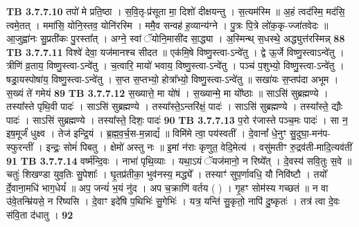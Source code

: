 \documentclass[17pt]{extarticle}
\begin{document}
{{{{{{{{{{{{{{{{{{{                  \newline
                                \textbf{ TB 3.7.7.10} \newline
                  तपो॑ मे प्रति॒ष्ठा । स॒वि॒तृ-प्र॑सूता मा॒ दिशो॑ दीक्षयन्तु । स॒त्यम॑स्मि ॥ अ॒हं त्वद॑स्मि॒ मद॑सि॒ त्वमे॒तत् । ममा॑सि॒ योनि॒स्तव॒ योनि॑रस्मि । ममै॒व सन्वह॑ ह॒व्यान्य॑ग्ने । पु॒त्रः पि॒त्रे लो॑क॒कृ-ज्जा॑तवेदः ॥ आ॒जुह्वा॑नः सु॒प्रती॑कः पु॒रस्ता᳚त् । अग्ने॒ स्वां ॅयोनि॒मासी॑द सा॒द्ध्या । अ॒स्मिन्थ् स॒धस्थे॒ अद्ध्युत्त॑रस्मिन्न् \textbf{ 88} \newline
                  \newline
                                \textbf{ TB 3.7.7.11} \newline
                  विश्वे॑ देवा॒ यज॑मानश्च सीदत ॥ एक॑मि॒षे विष्णु॒स्त्वा-ऽन्वे॑तु । द्वे ऊ॒र्जे विष्णु॒स्त्वाऽन्वे॑तु । त्रीणि॑ व्र॒ताय॒ विष्णु॒स्त्वा-ऽन्वे॑तु । च॒त्वारि॒ मायो॑ भवाय॒ विष्णु॒स्त्वा-ऽन्वे॑तु । पञ्च॑ प॒शुभ्यो॒ विष्णु॒स्त्वा-ऽन्वे॑तु । षड्रा॒यस्पोषा॑य॒ विष्णु॒स्त्वा-ऽन्वे॑तु । स॒प्त स॒प्तभ्यो॒ होत्रा᳚भ्यो॒ विष्णु॒स्त्वा-ऽन्वे॑तु ॥ सखा॑यः स॒प्तप॑दा अभूम । स॒ख्यं ते॑ गमेयं \textbf{ 89} \newline
                  \newline
                                \textbf{ TB 3.7.7.12} \newline
                  स॒ख्यात्ते॒ मा यो॑षं । स॒ख्यान्मे॒ मा यो᳚ष्ठाः ॥ साऽसि॑ सुब्रह्मण्ये । तस्या᳚स्ते पृथि॒वी पादः॑ । साऽसि॑ सुब्रह्मण्ये । तस्या᳚स्ते॒ऽन्तरि॑क्षं॒ पादः॑ । साऽसि॑ सुब्रह्मण्ये । तस्या᳚स्ते॒ द्यौः पादः॑ । साऽसि॑ सुब्रह्मण्ये । तस्या᳚स्ते॒ दिशः॒ पादः॑ \textbf{ 90} \newline
                  \newline
                                \textbf{ TB 3.7.7.13} \newline
                  प॒रो र॑जास्ते पञ्च॒मः पादः॑ । सा न॒ इष॒मूर्जं॑ धुक्ष्व । तेज॑ इन्द्रि॒यं । ब्र॒ह्म॒व॒र्च॒स-म॒न्नाद्यं᳚ ॥ विमि॑मे त्वा॒ पय॑स्वतीं । दे॒वानां᳚ धे॒नुꣳ सु॒दुघा॒-मन॑प-स्फुरन्तीं । इन्द्रः॒ सोमं॑ पिबतु । क्षेमो॑ अस्तु नः ॥ इ॒मां न॑राः कृणुत॒ वेदि॒मेत्य॑ । वसु॑मतीꣳ रु॒द्रव॑ती-मादि॒त्यव॑तीं \textbf{ 91} \newline
                  \newline
                                \textbf{ TB 3.7.7.14} \newline
                  वर्ष्म॑न्दि॒वः । नाभा॑ पृथि॒व्याः । यथा॒ऽयं ॅयज॑मानो॒ न रिष्ये᳚त् । दे॒वस्य॑ सवि॒तुः स॒वे ॥ चतुः॑ शिखण्डा युव॒तिः सु॒पेशाः᳚ । घृ॒तप्र॑तीका॒ भुव॑नस्य॒ मद्ध्ये᳚ । तस्याꣳ॑ सुप॒र्णावधि॒ यौ निवि॑ष्टौ । तयो᳚ र्दे॒वाना॒मधि॑ भाग॒धेयं᳚ ॥ अप॒ जन्यं॑ भ॒यं नु॑द । अप च॒क्राणि॑ वर्तय ( ) । गृ॒हꣳ सोम॑स्य गच्छतं ॥ न वा उ॑वे॒तन्म्रि॑यसे॒ न रि॑ष्यसि । दे॒वाꣳ इदे॑षि प॒थिभिः॑ सु॒गेभिः॑ । यत्र॒ यन्ति॑ सु॒कृतो॒ नापि॑ दु॒ष्कृतः॑ । तत्र॑ त्वा दे॒वः स॑वि॒ता द॑धातु । \textbf{ 92} \newline
}}}}}}}}}}}}}}}}}}}
\end{document}
